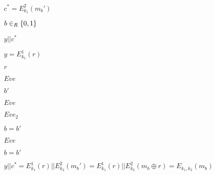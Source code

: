 \documentclass[10pt]{book}
\begin{document}
\begin{mdSnippets}
\begin{mdInlineSnippet}[b410980c977062397d865bd8d3cb64da]
$c^* = E^2_{k_1}(m_b')$\end{mdInlineSnippet}%
\begin{mdInlineSnippet}%
$b \in_R \{0,1\}$\end{mdInlineSnippet}%
\begin{mdInlineSnippet}[d9fe97a550f01b2f9d69fe65235fae45]%
$y||c^*$\end{mdInlineSnippet}%
\begin{mdInlineSnippet}[a69a0d21ed0f8004db8b56c83bb6c158]%
$y = E^1_{k_1}(r)$\end{mdInlineSnippet}%
\begin{mdInlineSnippet}[4b43b0aee35624cd95b910189b3dc231]%
$r$\end{mdInlineSnippet}%
\begin{mdInlineSnippet}%
$Eve$\end{mdInlineSnippet}%
\begin{mdInlineSnippet}[2765802181072b3aa2be59dae8c72b0d]%
$b'$\end{mdInlineSnippet}%
\begin{mdInlineSnippet}%
$Eve$\end{mdInlineSnippet}%
\begin{mdInlineSnippet}[3904b64d4d693f51b9fded75549bc9fc]%
$Eve_2$\end{mdInlineSnippet}%
\begin{mdInlineSnippet}[2b6e49448e7d732421cbac8655e4f76a]%
$b = b'$\end{mdInlineSnippet}%
\begin{mdInlineSnippet}%
$Eve$\end{mdInlineSnippet}%
\begin{mdInlineSnippet}[2b6e49448e7d732421cbac8655e4f76a]%
$b = b'$\end{mdInlineSnippet}%
\begin{mdInlineSnippet}[586d0c8c1d7341dd743dc74c1950b832]%
$y || c^* = E^1_{k_1}(r) || E^2_{k_2}(m_b') = E^1_{k_1}(r) || E^2_{k_2}(m_b \oplus r) = E_{k_1,k_2}(m_b)$\end{mdInlineSnippet}%
\begin{mdInlineSnippet}%

\end{mdInlineSnippet}
\end{mdSnippets}
\end{document}
